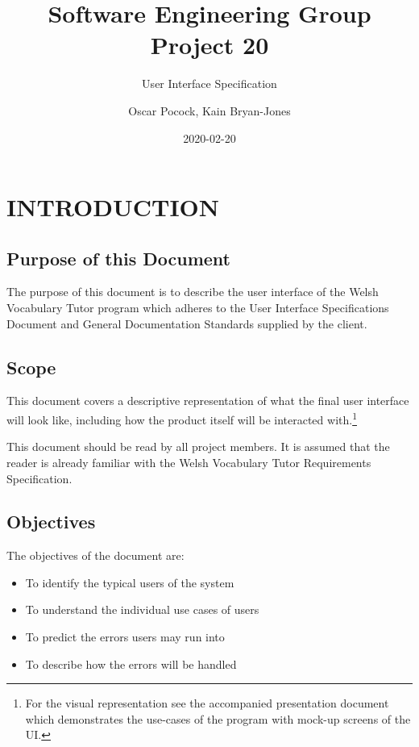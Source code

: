 \documentclass{project}
\begin{document}
\title{Software Engineering Group Project 20}
\subtitle{User Interface Specification}
\author{Oscar Pocock, Kain Bryan-Jones}     
\date{2020-02-20}
\maketitle
\tableofcontents
\newpage
\section{INTRODUCTION}
\subsection{Purpose of this Document}
The purpose of this document is to describe the user interface of the Welsh Vocabulary Tutor program which adheres to the User Interface Specifications Document\cite{se.qa.04} and General Documentation Standards\cite{se.qa.02} supplied by the client.

\subsection{Scope}
This document covers a descriptive representation of what the final user interface will look like, including how the product itself will be interacted with.\footnote{For the visual representation see the accompanied presentation document which demonstrates the use-cases of the program with mock-up screens of the UI.}

This document should be read by all project members. It is assumed that the reader is already familiar with the Welsh Vocabulary Tutor Requirements Specification\cite{se.qa.csrs}.
\subsection{Objectives}
The objectives of the document are:
\begin{itemize}
	\item To identify the typical users of the system
	\item To understand the individual use cases of users
	\item To predict the errors users may run into
	\item To describe how the errors will be handled
\end{itemize}
\end{document}
